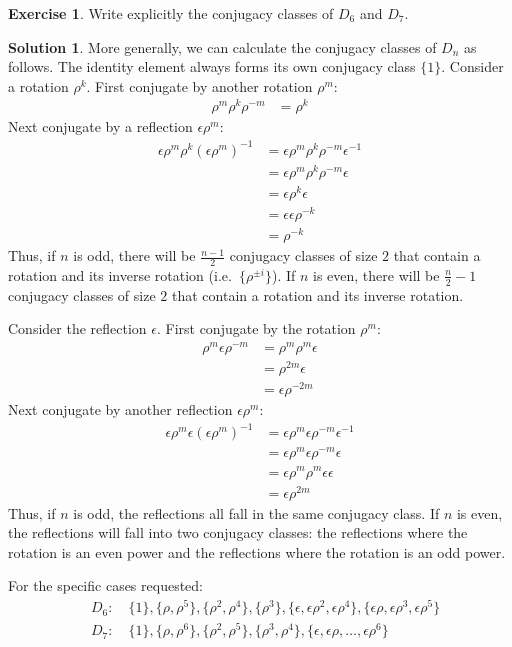 \documentclass[12pt]{article}
\theoremstyle{definition}
\newcommand{\e}{\epsilon}
\newtheorem{exercise}{\color{YellowOrange}Exercise}
\theoremstyle{definition}
\newtheorem{solution}{\color{Goldenrod}Solution}
\begin{document}
\begin{exercise}
Write explicitly the conjugacy classes of $D_6$ and $D_7$. 
\end{exercise}
\begin{solution}
More generally, we can calculate the conjugacy classes of $D_n$ as follows. The identity element always forms its own conjugacy class $\{1\}$. Consider a rotation $\rho^k$. First conjugate by another rotation $\rho^m$:
\begin{align*}
	\rho^m \rho^k \rho^{-m} &= \rho^k
\end{align*}	
Next conjugate by a reflection $\e \rho^m$:
\begin{align*}
	\e \rho^m \rho^k (\e \rho^m)^{-1} &= \e \rho^m \rho^k \rho^{-m} \e^{-1} \\
	&= \e \rho^m \rho^k \rho^{-m} \e \\
	&= \e \rho^k \e \\
	&= \e \e \rho^{-k} \\
	&= \rho^{-k}
\end{align*}
Thus, if $n$ is odd, there will be $\frac{n-1}{2}$ conjugacy classes of size $2$ that contain a rotation and its inverse rotation (i.e.\ $\{\rho^{\pm i}\}$). If $n$ is even, there will be $\frac{n}{2}-1$ conjugacy classes of size $2$ that contain a rotation and its inverse rotation.  

Consider the reflection $\e$. First conjugate by the rotation $\rho^m$:
\begin{align*}
	\rho^m \e \rho^{-m} &= \rho^m \rho^m \e \\
	&= \rho^{2m} \e \\
	&= \e \rho^{-2m} 
\end{align*}
Next conjugate by another reflection $\e\rho^m$:
\begin{align*}
	\e \rho^m \e (\e \rho^m)^{-1} &= \e \rho^m \e \rho^{-m} \e^{-1} \\
	&= \e \rho^m \e \rho^{-m} \e \\
	&= \e \rho^m \rho^{m} \e \e \\
	&= \e \rho^{2m}
\end{align*}
Thus, if $n$ is odd, the reflections all fall in the same conjugacy class. If $n$ is even, the reflections will fall into two conjugacy classes: the reflections where the rotation is an even power and the reflections where the rotation is an odd power. 

For the specific cases requested:
\begin{align*}
	&D_6: \quad \{1\}, \{\rho, \rho^5\}, \{\rho^2, \rho^4\}, \{\rho^3\}, \{\e,\e\rho^2, \e\rho^4\}, \{\e\rho, \e\rho^3, \e\rho^5\} \\
	&D_7: \quad \{1\}, \{\rho, \rho^6\}, \{\rho^2,\rho^5\}, \{\rho^3,\rho^4\}, \{\e, \e\rho, \ldots, \e\rho^6\}
\end{align*}
\end{solution}
\end{document}
